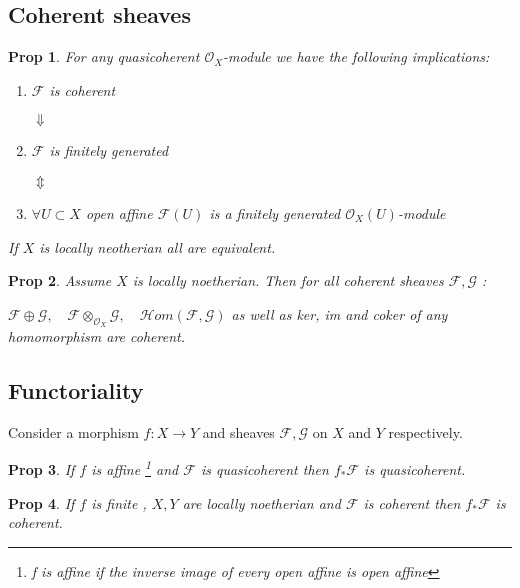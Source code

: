 \documentclass[a4paper, 12pt]{article}
\newcommand{\caf}{\mathcal{F}}
\newcommand{\cag}{\mathcal{G}}
\newcommand{\oxmod}{$\mathcal{O}_X$-module }
\newcommand{\ox}{\mathcal{O}_X}
\newcommand{\hhom}{\mathcal{H}om}
\newtheorem*{prop}{Prop}
\begin{document}
	
	
	
	
	\subsection{Coherent sheaves}
	
	\begin{prop}
		For any quasicoherent \oxmod we have the following implications:
		
		\begin{enumerate}
			\item $ \caf $ is coherent
			
			$\Downarrow$
			
			\item $ \caf $ is finitely generated
			
			$ \Updownarrow $
			
			\item $ \forall U \subset X $ open affine $ \caf(U) $ is a finitely generated $ \ox(U) $-module
		\end{enumerate}
		
		If $ X $ is locally neotherian all are equivalent.
	\end{prop}
	
	\begin{prop}
		Assume $ X $ is locally noetherian. Then for all coherent sheaves $ \caf,\cag $ :
		
		$ \caf \oplus \cag ,  \quad \caf \otimes_{\ox} \cag , \quad \hhom(\caf,\cag) $ as well as ker, im and coker of any homomorphism are coherent.
	\end{prop}
	
	
	
	
	\subsection{Functoriality}
	
	Consider a morphism $ f:X \longrightarrow Y $  and sheaves $ \caf, \cag $ on $ X $ and $ Y $ respectively.
	
	\begin{prop}
		If $ f $ is affine \footnote{f is affine if the inverse image of every open affine is open affine} and $ \caf $ is quasicoherent then $ f_*\caf $ is quasicoherent.
	\end{prop}
	
	\begin{prop}
		If $ f $ is finite , $ X,Y $ are locally noetherian and $ \caf $ is coherent then $ f_*\caf $ is coherent.
	\end{prop}
	
\end{document}
